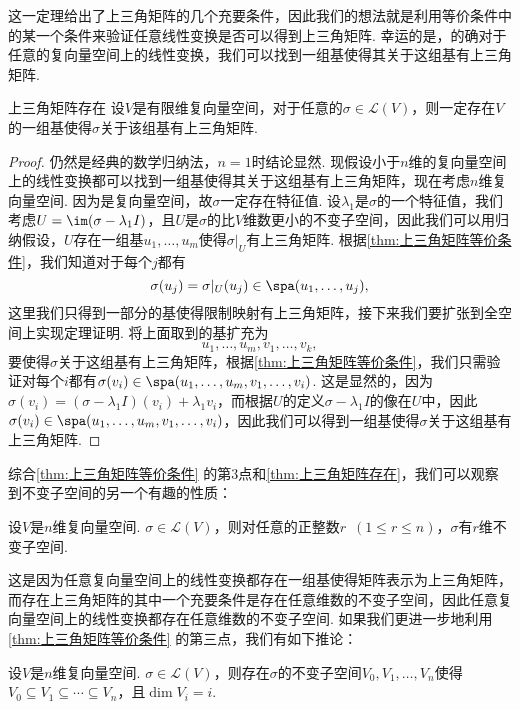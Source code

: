 这一定理给出了上三角矩阵的几个充要条件，因此我们的想法就是利用等价条件中的某一个条件来验证任意线性变换是否可以得到上三角矩阵. 幸运的是，的确对于任意的复向量空间上的线性变换，我们可以找到一组基使得其关于这组基有上三角矩阵.
\begin{theorem}{}{上三角矩阵存在}
    设$V$是有限维复向量空间，对于任意的$\sigma\in \mathcal{L}(V)$，则一定存在$V$的一组基使得$\sigma$关于该组基有上三角矩阵.
\end{theorem}
\begin{proof}
    仍然是经典的数学归纳法，$n=1$时结论显然. 现假设小于$n$维的复向量空间上的线性变换都可以找到一组基使得其关于这组基有上三角矩阵，现在考虑$n$维复向量空间. 因为是复向量空间，故$\sigma$一定存在特征值. 设$\lambda_1$是$\sigma$的一个特征值，我们考虑$U=\im(\sigma-\lambda_1 I)$，且$U$是$\sigma$的比$V$维数更小的不变子空间，因此我们可以用归纳假设，$U$存在一组基$u_1,\ldots,u_m$使得$\sigma\vert_U$有上三角矩阵. 根据\autoref{thm:上三角矩阵等价条件}，我们知道对于每个$j$都有
    \[\sigma(u_j)=\sigma\vert_U(u_j)\in\spa(u_1,\ldots,u_j),\]
    这里我们只得到一部分的基使得限制映射有上三角矩阵，接下来我们要扩张到全空间上实现定理证明. 将上面取到的基扩充为
    \[u_1,\ldots,u_m,v_1,\ldots,v_k,\]
    要使得$\sigma$关于这组基有上三角矩阵，根据\autoref{thm:上三角矩阵等价条件}，我们只需验证对每个$i$都有$\sigma(v_i)\in\spa(u_1,\ldots,u_m,v_1,\ldots,v_i)$. 这是显然的，因为$\sigma(v_i)=(\sigma-\lambda_1 I)(v_i)+\lambda_1 v_i$，而根据$U$的定义$\sigma-\lambda_1 I$的像在$U$中，因此$\sigma(v_i)\in\spa(u_1,\ldots,u_m,v_1,\ldots,v_i)$，因此我们可以得到一组基使得$\sigma$关于这组基有上三角矩阵.
\end{proof}

综合\autoref{thm:上三角矩阵等价条件} 的第3点和\autoref{thm:上三角矩阵存在}，我们可以观察到不变子空间的另一个有趣的性质：
\begin{corollary}{}{}
    设$V$是$n$维复向量空间. $\sigma\in \mathcal{L}(V)$，则对任意的正整数$r\enspace(1\leqslant r\leqslant n)$，$\sigma$有$r$维不变子空间.
\end{corollary}
这是因为任意复向量空间上的线性变换都存在一组基使得矩阵表示为上三角矩阵，而存在上三角矩阵的其中一个充要条件是存在任意维数的不变子空间，因此任意复向量空间上的线性变换都存在任意维数的不变子空间. 如果我们更进一步地利用\autoref{thm:上三角矩阵等价条件} 的第三点，我们有如下推论：
\begin{corollary}{}{}
    设$V$是$n$维复向量空间. $\sigma\in \mathcal{L}(V)$，则存在$\sigma$的不变子空间$V_0,V_1,\ldots,V_n$使得$V_0\subseteq V_1\subseteq\cdots\subseteq V_n$，且$\dim V_i=i$.
\end{corollary}

